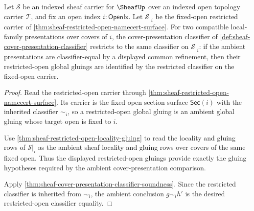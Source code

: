 \begin{theorem}
\label{thm:sheaf-restricted-open-cover-presentation-classifier-descent}
Let $\mathcal{S}$ be an indexed sheaf carrier for $\SheafUp$ over an indexed open topology carrier $\mathcal{T}$, and fix an open index $i:\mathsf{OpenIx}$. Let $\mathcal{S}|_i$ be the fixed-open restricted carrier of \autoref{thm:sheaf-restricted-open-namecert-surface}. For two compatible local-family presentations over covers of $i$, the cover-presentation classifier of \autoref{def:sheaf-cover-presentation-classifier} restricts to the same classifier on $\mathcal{S}|_i$: if the ambient presentations are classifier-equal by a displayed common refinement, then their restricted-open global gluings are identified by the restricted classifier on the fixed-open carrier.
\end{theorem}
\begin{proof}
Read the restricted-open carrier through \autoref{thm:sheaf-restricted-open-namecert-surface}. Its carrier is the fixed open section surface $\mathsf{Sec}(i)$ with the inherited classifier $\sim_i$, so a restricted-open global gluing is an ambient global gluing whose target open is fixed to $i$.

Use \autoref{thm:sheaf-restricted-open-locality-gluing} to read the locality and gluing rows of $\mathcal{S}|_i$ as the ambient sheaf locality and gluing rows over covers of the same fixed open. Thus the displayed restricted-open gluings provide exactly the gluing hypotheses required by the ambient cover-presentation comparison.

Apply \autoref{thm:sheaf-cover-presentation-classifier-soundness}. Since the restricted classifier is inherited from $\sim_i$, the ambient conclusion $g\sim_i h'$ is the desired restricted-open classifier equality.
\end{proof}

